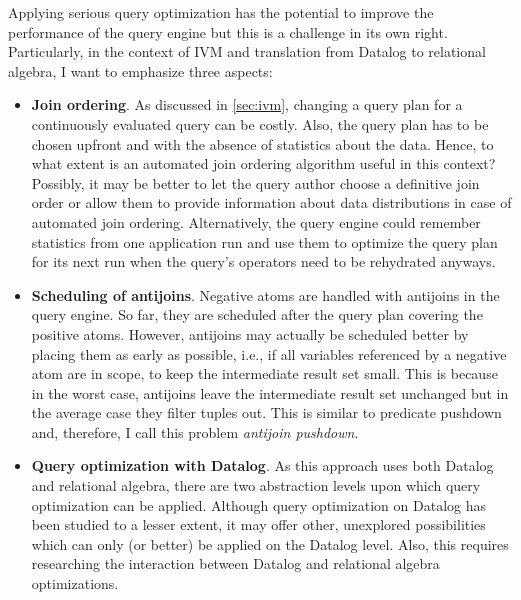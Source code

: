 
Applying serious query optimization has the potential to improve
the performance of the query engine but this is a challenge in its own right.
Particularly, in the context of \ac{IVM} and translation from Datalog to
relational algebra, I want to emphasize three aspects:

\begin{itemize}
	\item \textbf{Join ordering}.
	      As discussed in \ref{sec:ivm}, changing a query plan for a continuously
	      evaluated query can be costly.
	      Also, the query plan has to be chosen upfront and with the absence of
	      statistics about the data.
	      Hence, to what extent is an automated join ordering algorithm useful
	      in this context? Possibly, it may be better to let the query
	      author choose a definitive join order or allow them to provide
	      information about data distributions in case of automated join ordering.
		  Alternatively, the query engine could remember statistics from one
		  application run and use them to optimize the query plan for its next
		  run when the query's operators need to be rehydrated anyways.
	\item \textbf{Scheduling of antijoins}.
	      Negative atoms are handled with antijoins in the query engine.
	      So far, they are scheduled after the query plan covering the
	      positive atoms.
	      However, antijoins may actually be scheduled better by placing them
	      as early as possible, i.e., if all variables referenced by a
	      negative atom are in scope, to keep the intermediate result set small.
	      This is  because in the worst case, antijoins leave the intermediate
	      result set unchanged but in the average case they filter tuples out.
	      This is similar to predicate pushdown and, therefore, I call this
	      problem \emph{antijoin pushdown}.
	\item \textbf{Query optimization with Datalog}.
	      As this approach uses both Datalog and relational algebra,
		  there are two abstraction levels upon which query optimization
		  can be applied.
		  Although query optimization on Datalog has been studied
		  to a lesser extent, it may offer other, unexplored possibilities
		  which can only (or better) be applied on the Datalog level.
		  Also, this requires researching the interaction between
		  Datalog and relational algebra optimizations.
\end{itemize}

